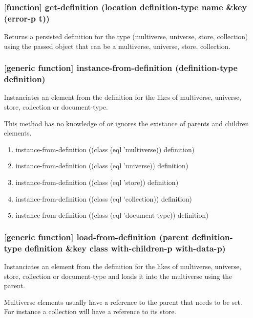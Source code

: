 \documentclass[11pt]{article}
\begin{document}
\subsubsection{[function] get-definition (location definition-type name \&key (error-p t))}
\label{sec:orgb599887}

Returns a persisted definition for the type (multiverse, universe,
store, collection) using the passed object that can be a multiverse,
universe, store, collection.

\subsubsection{[generic function] instance-from-definition (definition-type definition)}
\label{sec:org80dbd5d}

Instanciates an element from the definition for the likes of
multiverse, universe, store, collection or document-type.

This method has no knowledge of or ignores the existance of parents
and children elements.

\begin{enumerate}
\item instance-from-definition ((class (eql 'multiverse)) definition)
\label{sec:orgdcf4636}
\item instance-from-definition ((class (eql 'universe)) definition)
\label{sec:org43b53e0}
\item instance-from-definition ((class (eql 'store)) definition)
\label{sec:org725e542}
\item instance-from-definition ((class (eql 'collection)) definition)
\label{sec:orgc4f2096}
\item instance-from-definition ((class (eql 'document-type)) definition)
\label{sec:org6703cd7}
\end{enumerate}

\subsubsection{[generic function] load-from-definition (parent definition-type definition \&key class with-children-p with-data-p)}
\label{sec:orge56fb41}

Instanciates an element from the definition for the likes of
multiverse, universe, store, collection or document-type and loads it
into the multiverse using the parent.

Multiverse elements usually have a reference to the parent that needs
to be set. For instance a collection will have a reference to its
store.
\end{document}
